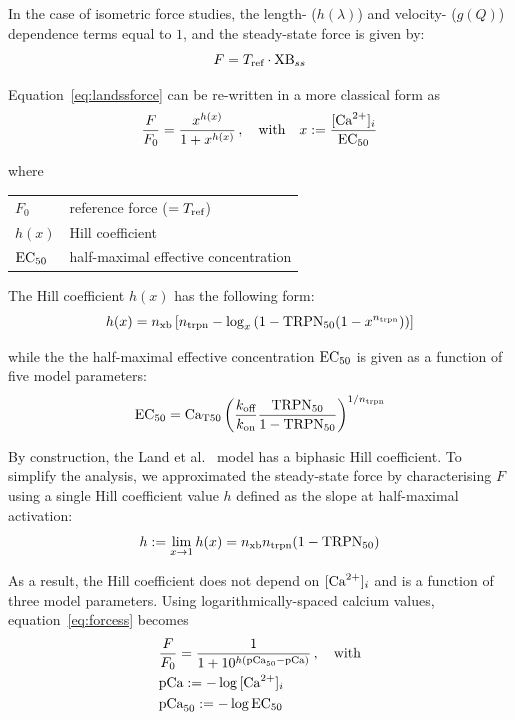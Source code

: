 \noindent
In the case of isometric force studies, the length- ($h(\lambda)$) and velocity- ($g(Q)$) dependence terms equal to $1$, and the steady-state force is given by:
%
\begin{equation}\label{eq:landssforce}
    F = T_{\textrm{ref}}\cdot \textrm{XB}_{ss}
\end{equation}

\noindent
Equation~\eqref{eq:landssforce} can be re-written in a more classical form as
%
\begin{equation}\label{eq:forcess}
    \frac{F}{F_0} = \frac{x^{h(x)}}{1+x^{h(x)}}\,,\quad\text{with}\quad x:=\frac{[\textrm{Ca}^{2+}]_{i}}{\textrm{EC}_{50}}
\end{equation}

\noindent
where

\vspace{0.2cm}
\begin{tabular}{ll}
    $F_0$  & reference force ($=T_{\textrm{ref}}$) \\
    $h(x)$ & Hill coefficient \\
    $\textrm{EC}_{50}$ & half-maximal effective concentration
\end{tabular}

\vspace{0.3cm}\noindent
The Hill coefficient $h(x)$ has the following form:
%
\begin{equation}
    h(x) = n_{\textrm{xb}}\left[n_{\textrm{trpn}}-\log_{x}{\left(1-\textrm{TRPN}_{50}(1-x^{n_{\textrm{trpn}}})\right)}\right]
\end{equation}

\noindent
while the the half-maximal effective concentration $\textrm{EC}_{50}$ is given as a function of five model parameters:
%
\begin{equation}\label{eq:ec50}
    \textrm{EC}_{50} = \textrm{Ca}_{\textrm{T}50}\left(\frac{k_{\textrm{off}}}{k_{\textrm{on}}}\frac{\textrm{TRPN}_{50}}{1-\textrm{TRPN}_{50}}\right)^{1/n_{\textrm{trpn}}}
\end{equation}

By construction, the Land et al.~\cite{Land:2012} model has a biphasic Hill coefficient. To simplify the analysis, we approximated the steady-state force by characterising $F$ using a single Hill coefficient value $h$ defined as the slope at half-maximal activation:
%
\begin{equation}\label{eq:h}
    h := \lim_{x\to1}h(x) = n_{\textrm{xb}}n_{\textrm{trpn}}(1-\textrm{TRPN}_{50})
\end{equation}

\noindent
As a result, the Hill coefficient does not depend on $[\textrm{Ca}^{2+}]_{i}$ and is a function of three model parameters. Using logarithmically-spaced calcium values, equation~\eqref{eq:forcess} becomes
%
\begin{align}\label{eq:FpCa}
    & \frac{F}{F_0} = \frac{1}{1+10^{h(\textrm{pCa}_{50}-\textrm{pCa})}}\,,\quad\text{with} \\
    & \textrm{pCa}:=-\log{[\textrm{Ca}^{2+}]_{i}} \\
    & \textrm{pCa}_{50}:=-\log{\textrm{EC}_{50}}
\end{align}

